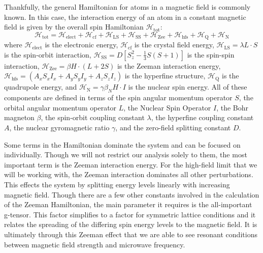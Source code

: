 \documentclass[oneside, astronomy, noacknowlegments]{BYUPhys}
\begin{document}
Thankfully, the general Hamiltonian for atoms in a magnetic field is commonly known. In this case, the interaction energy of an atom in a constant magnetic field is given by the overall spin Hamiltonian $\mathcal{H}_{\text{tot}}$: $$\mathcal{H}_{\text{tot}} = \mathcal{H}_{\text{elect}} + \mathcal{H}_{\text{cf}} + \mathcal{H}_{\text{LS}} + \mathcal{H}_{\text{SS}} + \mathcal{H}_{\text{Zee}} + \mathcal{H}_{\text{hfs}} + \mathcal{H}_{\text{Q}} + \mathcal{H}_{\text{N}}$$ where $\mathcal{H}_{\text{elect}}$ is the electronic energy, $\mathcal{H}_{\text{cf}}$ is the crystal field energy, $\mathcal{H}_{\text{LS}} = \lambda L \cdot S$ is the spin-orbit interaction, $\mathcal{H}_{\text{SS}} = D \left[ S_{z}^{2} - \frac{1}{3} S (S+1) \right]$ is the spin-spin interaction, $\mathcal{H}_{\text{Zee}} = \beta H \cdot (L+2S)$ is the Zeeman interaction energy, $\mathcal{H}_{\text{hfs}} = \left(A_xS_xI_x + A_yS_yI_y + A_zS_zI_z\right)$ is the hyperfine structure, $\mathcal{H}_{\text{Q}}$ is the quadrupole energy, and $\mathcal{H}_{\text{N}} = \gamma \beta_{N} H \cdot I$ is the nuclear spin energy. All of these components are defined in terms of the spin angular momentum operator $S$, the orbital angular momentum operator $L$, the Nuclear Spin Operator $I$, the Bohr magneton $\beta$, the spin-orbit coupling constant $\lambda$, the hyperfine coupling constant $A$, the nuclear gyromagnetic ratio $\gamma$, and the zero-field splitting constant $D$.

Some terms in the Hamiltonian dominate the system and can be focused on individually. Though we will not restrict our analysis solely to them, the most important term is the Zeeman interaction energy. For the high-field limit that we will be working with, the Zeeman interaction dominates all other perturbations. This effects the system by splitting energy levels linearly with increasing magnetic field. Though there are a few other constants involved in the calculation of the Zeeman Hamiltonian, the main parameter it requires is the all-important g-tensor. This factor simplifies to a factor for symmetric lattice conditions and it relates the spreading of the differing spin energy levels to the magnetic field. It is ultimately through this Zeeman effect that we are able to see resonant conditions between magnetic field strength and microwave frequency.
\end{document}
